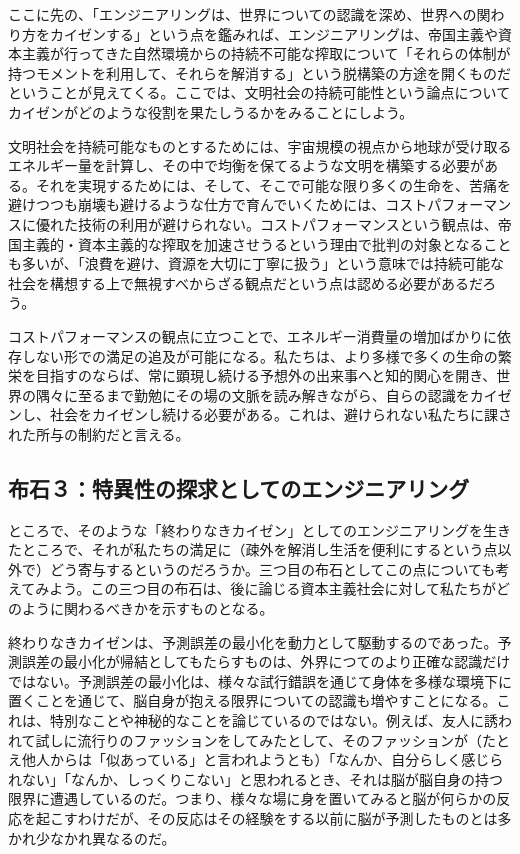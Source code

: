 ここに先の、「エンジニアリングは、世界についての認識を深め、世界への関わり方をカイゼンする」という点を鑑みれば、エンジニアリングは、帝国主義や資本主義が行ってきた自然環境からの持続不可能な搾取について「それらの体制が持つモメントを利用して、それらを解消する」という脱構築の方途を開くものだということが見えてくる。ここでは、文明社会の持続可能性という論点についてカイゼンがどのような役割を果たしうるかをみることにしよう。

文明社会を持続可能なものとするためには、宇宙規模の視点から地球が受け取るエネルギー量を計算し、その中で均衡を保てるような文明を構築する必要がある。それを実現するためには、そして、そこで可能な限り多くの生命を、苦痛を避けつつも崩壊も避けるような仕方で育んでいくためには、コストパフォーマンスに優れた技術の利用が避けられない。コストパフォーマンスという観点は、帝国主義的・資本主義的な搾取を加速させうるという理由で批判の対象となることも多いが、「浪費を避け、資源を大切に丁寧に扱う」という意味では持続可能な社会を構想する上で無視すべからざる観点だという点は認める必要があるだろう。

コストパフォーマンスの観点に立つことで、エネルギー消費量の増加ばかりに依存しない形での満足の追及が可能になる。私たちは、より多様で多くの生命の繁栄を目指すのならば、常に顕現し続ける予想外の出来事へと知的関心を開き、世界の隅々に至るまで勤勉にその場の文脈を読み解きながら、自らの認識をカイゼンし、社会をカイゼンし続ける必要がある。これは、避けられない私たちに課された所与の制約だと言える。

\subsection{布石３：特異性の探求としてのエンジニアリング}\label{ux5e03ux77f3uxff13ux7279ux7570ux6027ux306eux63a2ux6c42ux3068ux3057ux3066ux306eux30a8ux30f3ux30b8ux30cbux30a2ux30eaux30f3ux30b0}

ところで、そのような「終わりなきカイゼン」としてのエンジニアリングを生きたところで、それが私たちの満足に（疎外を解消し生活を便利にするという点以外で）どう寄与するというのだろうか。三つ目の布石としてこの点についても考えてみよう。この三つ目の布石は、後に論じる資本主義社会に対して私たちがどのように関わるべきかを示すものとなる。

終わりなきカイゼンは、予測誤差の最小化を動力として駆動するのであった。予測誤差の最小化が帰結としてもたらすものは、外界につてのより正確な認識だけではない。予測誤差の最小化は、様々な試行錯誤を通じて身体を多様な環境下に置くことを通じて、脳自身が抱える限界についての認識も増やすことになる。これは、特別なことや神秘的なことを論じているのではない。例えば、友人に誘われて試しに流行りのファッションをしてみたとして、そのファッションが（たとえ他人からは「似あっている」と言われようとも）「なんか、自分らしく感じられない」「なんか、しっくりこない」と思われるとき、それは脳が脳自身の持つ限界に遭遇しているのだ。つまり、様々な場に身を置いてみると脳が何らかの反応を起こすわけだが、その反応はその経験をする以前に脳が予測したものとは多かれ少なかれ異なるのだ。


